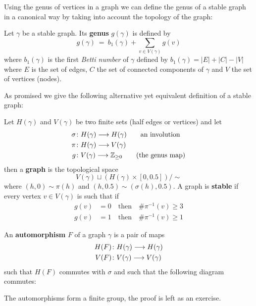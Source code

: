 Using the genus of vertices in a graph we can define the genus of a stable graph in a canonical way by taking into account the topology of the graph:

\begin{definition}
  Let $\gamma$ be a stable graph. Its \textbf{genus} $g(\gamma)$ is defined by
  $$ g(\gamma) \ = \ b_1(\gamma) + \sum_{v\in V(\gamma)} g(v) $$
  where $b_1(\gamma)$ is the first \emph{Betti number} of $\gamma$ defined by $b_1(\gamma) = |E| + |C| - |V|$ where $E$ is the set of edges, $C$ the set of connected components of $\gamma$ and $V$ the set of vertices (nodes).
\end{definition}

As promised we give the following alternative yet equivalent definition of a stable graph:

\begin{definition}
  Let $H(\gamma)$ and $V(\gamma)$ be two finite sets (half edges or vertices) and let
  \begin{align*}
    \sigma &\colon H(\gamma) \longrightarrow H(\gamma) \quad \quad \text{an involution}\\
    \pi &\colon H(\gamma) \longrightarrow V(\gamma)\\
    g &\colon V(\gamma) \longrightarrow \mathbb{Z}_{\geq 0} \quad \quad \text{(the genus map)}
  \end{align*}
  then a \textbf{graph} is the topological space
  $$ V(\gamma) \sqcup (H(\gamma) \times [0, 0.5]) / \sim $$
  where $(h,0) \sim \pi(h)$ and $(h,0.5) \sim (\sigma(h), 0.5)$. A graph is \textbf{stable} if every vertex $v \in V(\gamma)$ is such that if
  \begin{align*}
    g(v) &= 0 \quad \text{then} \quad \# \pi^{-1}(v) \geq 3\\
    g(v) &= 1 \quad \text{then} \quad \# \pi^{-1}(v) \geq 1
  \end{align*}
\end{definition}

\begin{definition}
  An \textbf{automorphism} $F$ of a graph $\gamma$ is a pair of maps
  \begin{align*}
    H(F) &\colon H(\gamma) \longrightarrow H(\gamma)\\
    V(F) &\colon V(\gamma) \longrightarrow V(\gamma)
  \end{align*}
  such that $H(F)$ commutes with $\sigma$ and such that the following diagram commutes:
  \begin{center}
  \end{center}
  The automorphisms form a finite group, the proof is left as an exercise.
\end{definition}

